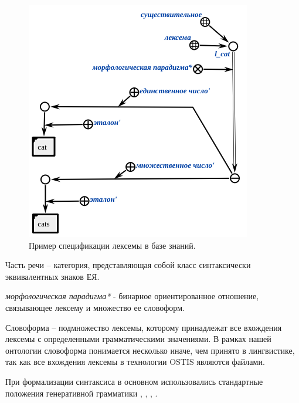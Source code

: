 \begin{figure}[h]
    \centering
    \includegraphics[scale=0.8]{images/part2/chapter_lang/lexeme_example}
    \caption{Пример спецификации лексемы в базе знаний.}
    \label{fig:lexeme_example}
\end{figure}

Часть речи -- категория, представляющая собой класс синтаксически эквивалентных знаков ЕЯ.

\begin{SCn}


\end{SCn}

\textit{морфологическая парадигма*} - бинарное ориентированное отношение, связывающее лексему и множество ее словоформ.

Словоформа -- подмножество лексемы, которому принадлежат все вхождения лексемы с определенными грамматическими значениями.
В рамках нашей онтологии словоформа понимается несколько иначе, чем принято в лингвистике, так как все вхождения лексемы в технологии OSTIS являются файлами.

При формализации синтаксиса в основном использовались стандартные положения генеративной грамматики , , , .


